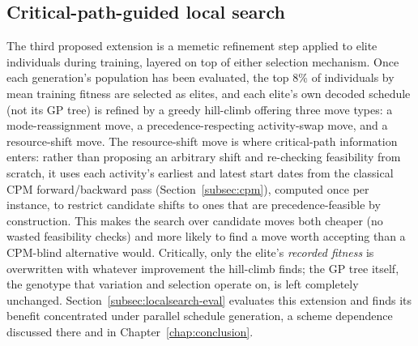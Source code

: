 \subsection{Critical-path-guided local search}
\label{subsec:localsearch-definition}

The third proposed extension is a  memetic refinement step
applied to elite individuals during training, layered on top of either
selection mechanism. Once each generation's population has been evaluated,
the top 8\% of individuals by mean training fitness are selected as elites,
and each elite's own decoded schedule (not its GP tree) is refined by a
greedy hill-climb offering three move types: a mode-reassignment move, a
precedence-respecting activity-swap move, and a resource-shift move. The
resource-shift move is where critical-path information enters: rather than
proposing an arbitrary shift and re-checking feasibility from scratch, it
uses each activity's earliest and latest start dates from the classical CPM
forward/backward pass (Section~\ref{subsec:cpm}), computed once per
instance, to restrict candidate shifts to ones that are precedence-feasible
by construction. This makes the search over candidate moves both cheaper
(no wasted feasibility checks) and more likely to find a move worth
accepting than a CPM-blind alternative would. Critically, only the elite's
\emph{recorded fitness} is overwritten with whatever improvement the
hill-climb finds; the GP tree itself, the genotype that variation and
selection operate on, is left completely unchanged. 
Section~\ref{subsec:localsearch-eval} evaluates this extension and finds
its benefit concentrated under parallel schedule generation, a scheme
dependence discussed there and in Chapter~\ref{chap:conclusion}.

